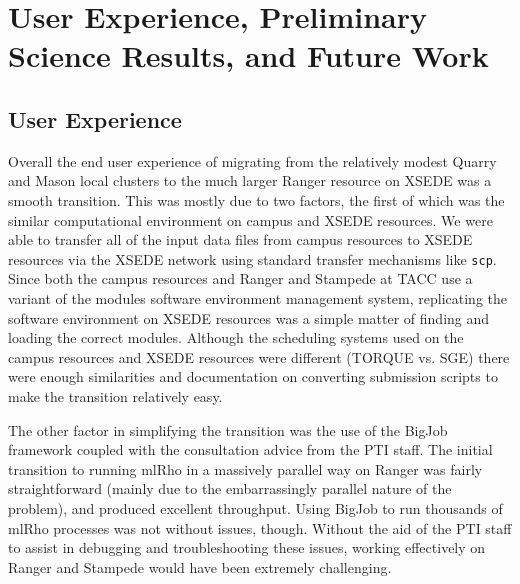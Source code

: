 \documentclass{sig-alternate}
\newcommand{\abhi}[1]{ {\textcolor{red} { ***Abhinav: #1 }}}
\newcommand{\abhi}[1]{ {}}
\begin{document}


\section{User Experience, Preliminary Science Results, and Future Work}\label{sec:results}
\subsection{User Experience}
Overall the end user experience of migrating from the relatively modest Quarry and Mason local clusters to the
much larger Ranger resource on XSEDE was a smooth transition. This was mostly due to two factors, the
first of which was the similar computational environment on campus and XSEDE resources. We were able to
transfer all of the input data files from campus resources to XSEDE resources via the
XSEDE network using standard transfer mechanisms like \texttt{scp}. Since both the campus resources and Ranger and
Stampede at TACC use a variant of the modules software environment management system, replicating the software
environment on XSEDE resources was a simple matter of finding and loading the correct modules. Although the
scheduling systems used on the campus resources and XSEDE resources were different (TORQUE vs. SGE) there were
enough similarities and documentation on converting submission scripts to make the transition relatively
easy. 
 
The other factor in simplifying  the transition was the use of the BigJob framework coupled with the
consultation advice from the PTI staff. The initial transition to running mlRho in a massively parallel
way on Ranger was fairly straightforward (mainly due to the embarrassingly parallel nature of the problem),
and produced excellent throughput. Using BigJob to run thousands of mlRho processes was not without
issues, though. Without the aid of the PTI staff to assist in debugging and troubleshooting these issues,
working effectively on Ranger and Stampede would have been extremely challenging. 
\end{document}
